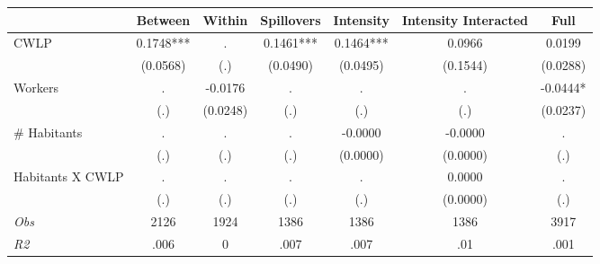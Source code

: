 \begin{tabular}{l*{6}{c}}\hline&\multicolumn{1}{c}{Between}&\multicolumn{1}{c}{Within}&\multicolumn{1}{c}{Spillovers}&\multicolumn{1}{c}{Intensity}&\multicolumn{1}{c}{Intensity Interacted}&\multicolumn{1}{c}{Full}\\ \hline 
CWLP & 0.1748*** & . & 0.1461*** & 0.1464*** & 0.0966 & 0.0199 \\
 & (0.0568) & (.) & (0.0490) & (0.0495) & (0.1544) & (0.0288) \\
Workers & . & -0.0176 & . & . & . & -0.0444* \\
 & (.) & (0.0248) & (.) & (.) & (.) & (0.0237) \\
\# Habitants & . & . & . & -0.0000 & -0.0000 & . \\
 & (.) & (.) & (.) & (0.0000) & (0.0000) & (.) \\
Habitants X CWLP & . & . & . & . & 0.0000 & . \\
 & (.) & (.) & (.) & (.) & (0.0000) & (.) \\
\hline \textit{Obs} & 2126 & 1924 & 1386 & 1386 & 1386 & 3917 \\ \textit{R2} & .006 & 0 & .007 & .007 & .01 & .001 \\ \hline \end{tabular}
